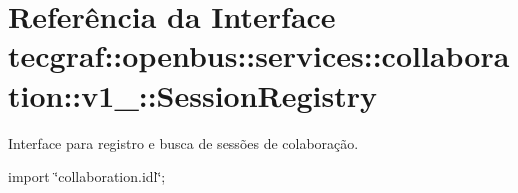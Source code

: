 \hypertarget{interfacetecgraf_1_1openbus_1_1services_1_1collaboration_1_1v1__0_1_1SessionRegistry}{\section{\-Referência da \-Interface tecgraf\-:\-:openbus\-:\-:services\-:\-:collaboration\-:\-:v1\-\_\-:\-:\-Session\-Registry}
\label{interfacetecgraf_1_1openbus_1_1services_1_1collaboration_1_1v1__0_1_1SessionRegistry}
}


\-Interface para registro e busca de sessões de colaboração.  




{\ttfamily import \char`\"{}collaboration.\-idl\char`\"{};}

